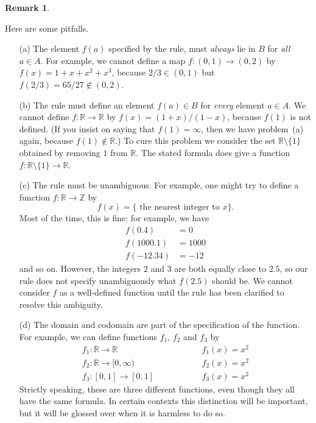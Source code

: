 \documentclass[a4paper]{book}
\newcommand{\RED}[1]{{\color{red}#1}}
\newcommand{\Z}         {{\mathbb{Z}}}
\newcommand{\R}         {{\mathbb{R}}}
\newcommand{\sm}        {\setminus}
\newcommand{\xra}       {\xrightarrow}
\renewcommand{\:}{\colon}
\newcommand{\bilabel}[1]{\hypertarget{#1}{\label{#1}}}
\newcommand{\EMPH}[1]{\RED{\emph{#1}}}
\theoremstyle{definition}
\newtheorem{remark}[theorem]{Remark}
\begin{document}
\begin{remark}\bilabel{rem-fn-pitfalls}
 Here are some pitfalls.
 \begin{itemize}
  \item[(a)] The element $f(a)$ specified by the rule, must
   \EMPH{always} lie in $B$ for \EMPH{all} $a\in A$.  For example, we
   cannot define a map $f\:(0,1)\xra{}(0,2)$ by $f(x)=1+x+x^2+x^3$,
   because $2/3\in(0,1)$ but $f(2/3)=65/27\not\in(0,2)$.
  \item[(b)] The rule must define an element $f(a)\in B$ for
   \EMPH{every} element $a\in A$.  We cannot define $f\:\R\xra{}\R$ by
   $f(x)=(1+x)/(1-x)$, because $f(1)$ is not defined.  (If you insist
   on saying that $f(1)=\infty$, then we have problem~(a) again,
   because $f(1)\not\in\R$.)  To cure this problem we consider the set
   $\R\sm\{1\}$ obtained by removing $1$ from $\R$.  The stated
   formula does give a function $f\:\R\sm\{1\}\xra{}\R$.
  \item[(c)] The rule must be unambiguous.  For example, one might try
   to define a function $f\:\R\xra{}\Z$ by
   \[ f(x) = \{ \text{ the nearest integer to } x \}. \]
   Most of the time, this is fine: for example, we have
   \begin{align*}
    f(0.4)    &= 0 \\
    f(1000.1) &= 1000 \\
    f(-12.34) &= -12
   \end{align*}
   and so on.  However, the integers $2$ and $3$ are both equally close
   to $2.5$, so our rule does not specify unambiguously what $f(2.5)$
   should be.  We cannot consider $f$ as a well-defined function until
   the rule has been clarified to resolve this ambiguity.
  \item[(d)] The domain and codomain are part of the specification of
   the function.  For example, we can define functions $f_1$, $f_2$ and
   $f_3$ by
   \[ \begin{array}{lll}
    f_1\:\R\xra{}\R         &\hspace{4em}& f_1(x) = x^2 \\
    f_2\:\R\xra{}[0,\infty) &\hspace{4em}& f_2(x) = x^2 \\
    f_3\:[0,1]\xra{}[0,1]   &\hspace{4em}& f_3(x) = x^2
   \end{array} \]
   Strictly speaking, these are three different functions, even though
   they all have the same formula.  In certain contexts this
   distinction will be important, but it will be glossed over when it
   is harmless to do so.
 \end{itemize}
\end{remark}
\end{document}

